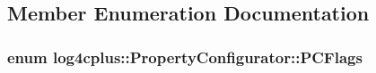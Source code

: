 \subsection{Member Enumeration Documentation}
\hypertarget{classlog4cplus_1_1PropertyConfigurator_af197ec849dc7460aefe46def3f9d4556}{
\subsubsection[{P\-C\-Flags}]{\setlength{\rightskip}{0pt plus 5cm}enum {\bf log4cplus\-::\-Property\-Configurator\-::\-P\-C\-Flags}}}\label{classlog4cplus_1_1PropertyConfigurator_af197ec849dc7460aefe46def3f9d4556}
